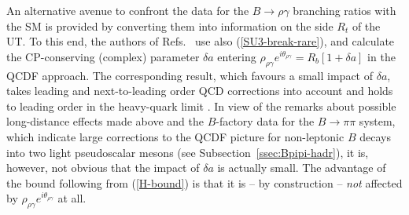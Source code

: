 \documentclass[12pt]{article}
\begin{document}
An alternative avenue to confront the data for the $B\to \rho\gamma$
branching ratios with the SM is provided by converting them into information
on the side $R_t$ of the UT. To this end, the authors of Refs.~\cite{ALP-rare,BoBu}
use also (\ref{SU3-break-rare}), and calculate the CP-conserving (complex) 
parameter $\delta a$ entering 
$\rho_{\rho\gamma}e^{i\theta_{\rho\gamma}}=R_b\left[1+\delta a\right]$
in the QCDF approach. The corresponding result, which favours a small impact 
of $\delta a$, takes leading and next-to-leading order QCD corrections into 
account and holds to leading order in the heavy-quark limit \cite{BoBu}. 
In view of the remarks about possible long-distance effects made above and the 
$B$-factory data for the $B\to\pi\pi$ system, which indicate large corrections 
to the QCDF picture for non-leptonic $B$ decays into two light pseudoscalar 
mesons (see Subsection~\ref{ssec:Bpipi-hadr}), it is, however, not obvious that 
the impact of $\delta a$ is actually small. The advantage of the bound
following from (\ref{H-bound}) is that it is  -- by construction -- {\it not} affected 
by $\rho_{\rho\gamma}e^{i\theta_{\rho\gamma}}$ at all.



%
%
%
\boldmath
\end{document}
